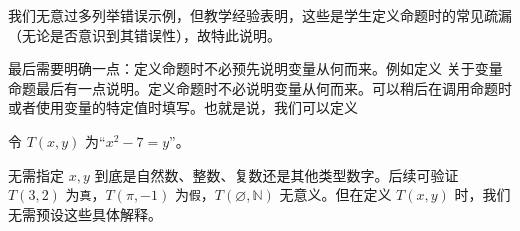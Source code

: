 我们无意过多列举错误示例，但教学经验表明，这些是学生定义命题时的常见疏漏（无论是否意识到其错误性），故特此说明。

最后需要明确一点：定义命题时不必预先说明变量从何而来。例如定义
关于变量命题最后有一点说明。定义命题时不必说明变量从何而来。可以稍后在调用命题时或者使用变量的特定值时填写。也就是说，我们可以定义
\begin{center}
    令 $T(x, y)$ 为``$x^2 - 7 = y$''。
\end{center}
无需指定 $x,y$ 到底是自然数、整数、复数还是其他类型数字。后续可验证 $T(3, 2)$ 为\verb|真|，$T(\pi, -1)$ 为\verb|假|，$T(\varnothing, \mathbb{N})$ 无意义。但在定义 $T(x,y)$ 时，我们无需预设这些具体解释。
